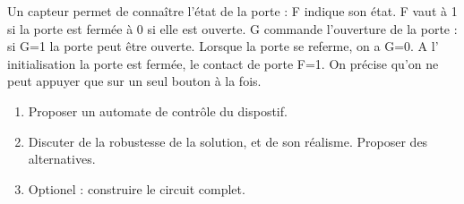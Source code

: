 \documentclass[a4paper,11pt]{article}
\begin{document}
Un capteur permet de connaître l'état de la porte : F indique son état. F vaut à 1 si la porte est fermée à 0 si elle est ouverte.
G commande l’ouverture de la porte : si G=1 la porte peut être ouverte. Lorsque la porte se referme, on a G=0.
A l’ initialisation la porte est fermée, le contact de porte F=1.
On précise qu'on ne peut appuyer que sur un seul bouton à la fois.

\begin{enumerate}
  \item Proposer un automate de contrôle du dispostif.
  \item Discuter de la robustesse de la solution, et de son réalisme. Proposer des alternatives.
  \item Optionel : construire le circuit complet.
\end{enumerate}
\end{document}
